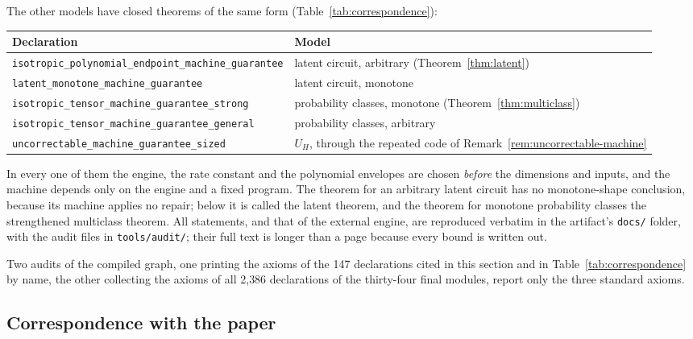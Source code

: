 \documentclass[11pt]{article}
\theoremstyle{remark}
\newcommand{\lean}[1]{\texttt{#1}}
\begin{document}
The other models have closed theorems of the same form
(Table~\ref{tab:correspondence}):
\begin{center}\small
\begin{tabular}{@{}p{}p{}@{}}
\toprule
Declaration & Model\\
\midrule
\lean{isotropic\_polynomial\_endpoint\_machine\_guarantee} &
latent circuit, arbitrary (Theorem~\ref{thm:latent})\\
\lean{latent\_monotone\_machine\_guarantee} &
latent circuit, monotone\\
\lean{isotropic\_tensor\_machine\_guarantee\_strong} &
probability classes, monotone (Theorem~\ref{thm:multiclass})\\
\lean{isotropic\_tensor\_machine\_guarantee\_general} &
probability classes, arbitrary\\
\lean{uncorrectable\_machine\_guarantee\_sized} &
\(U_H\), through the repeated code of
Remark~\ref{rem:uncorrectable-machine}\\
\bottomrule
\end{tabular}
\end{center}
In every one of them the engine, the rate constant and the polynomial
envelopes are chosen \emph{before} the dimensions and inputs, and the
machine depends only on the engine and a fixed program. The theorem for
an arbitrary latent circuit has no monotone-shape conclusion, because
its machine applies no repair; below it is called the latent theorem,
and the theorem for monotone probability classes the strengthened
multiclass theorem. All statements, and that of the external
engine, are reproduced verbatim in the artifact's \texttt{docs/} folder,
with the audit files in \texttt{tools/audit/}; their
full text is longer than a page because every bound is written out.

Two audits of the compiled graph, one printing the axioms of the 147
declarations cited in this section and in
Table~\ref{tab:correspondence} by name, the other collecting the axioms
of all 2{,}386 declarations of the thirty-four final modules, report
only the three standard axioms.

\subsection{Correspondence with the paper}
\end{document}
